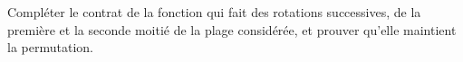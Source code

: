 

Compléter le contrat de la fonction  qui fait des
rotations successives, de la première et la seconde moitié de la plage
considérée, et prouver qu'elle maintient la permutation.


